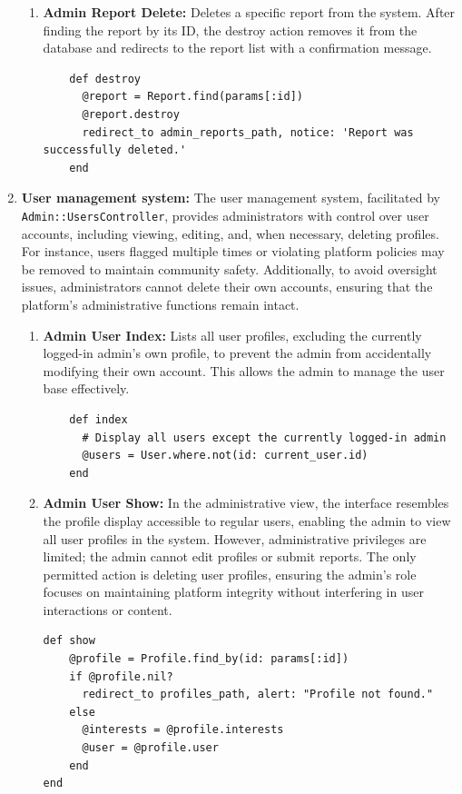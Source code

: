 \begin{enumerate}
\begin{enumerate}
            \item \textbf{Admin Report Delete:} 
            Deletes a specific report from the system. After finding the report by its ID, the destroy action removes it from the database and redirects to the report list with a confirmation message.
            \begin{lstlisting}
    def destroy
      @report = Report.find(params[:id])
      @report.destroy
      redirect_to admin_reports_path, notice: 'Report was successfully deleted.'
    end
            \end{lstlisting}
            \end{enumerate}

        \newpage
        \item \textbf{User management system:} 
        The user management system, facilitated by \texttt{Admin::UsersController}, provides administrators with control over user accounts, including viewing, editing, and, when necessary, deleting profiles. For instance, users flagged multiple times or violating platform policies may be removed to maintain community safety. Additionally, to avoid oversight issues, administrators cannot delete their own accounts, ensuring that the platform’s administrative functions remain intact.
            \begin{enumerate}
            \item \textbf{Admin User Index:} 
            Lists all user profiles, excluding the currently logged-in admin’s own profile, to prevent the admin from accidentally modifying their own account. This allows the admin to manage the user base effectively.
            \begin{lstlisting}
    def index
      # Display all users except the currently logged-in admin
      @users = User.where.not(id: current_user.id)
    end
            \end{lstlisting}

            \newpage
            \item \textbf{Admin User Show:} 
            In the administrative view, the interface resembles the profile display accessible to regular users, enabling the admin to view all user profiles in the system. However, administrative privileges are limited; the admin cannot edit profiles or submit reports. The only permitted action is deleting user profiles, ensuring the admin’s role focuses on maintaining platform integrity without interfering in user interactions or content.
            \begin{lstlisting}
def show
    @profile = Profile.find_by(id: params[:id])
    if @profile.nil?
      redirect_to profiles_path, alert: "Profile not found."
    else
      @interests = @profile.interests
      @user = @profile.user
    end
end
            \end{lstlisting}


\end{enumerate}
\end{enumerate}
